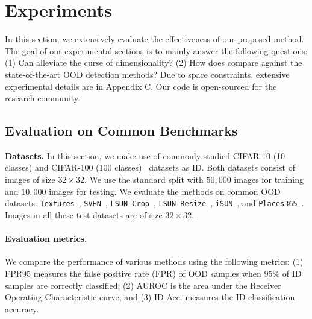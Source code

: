 
\section{Experiments}
\label{sec:experiment}



In this section, we extensively evaluate the effectiveness of our proposed method. 
The goal of our experimental sections is to mainly answer the following questions: (1) Can \name alleviate the curse of dimensionality? (2) How does \name compare against the state-of-the-art OOD detection methods?  Due to space constraints, extensive experimental details are in Appendix C. Our code is open-sourced for the research community.


\subsection{Evaluation on Common Benchmarks}
\label{subsec:common_benchmark}

\noindent \textbf{Datasets.} In this section, we make use of commonly studied CIFAR-10 (10 classes) and CIFAR-100 (100 classes)~\cite{krizhevsky2009learning} datasets as ID. Both datasets consist of images of size $32 \times 32$. We use the standard split with $50,000$ images for training and $10,000$ images for testing. We evaluate the methods on common OOD datasets: \texttt{Textures}~\cite{cimpoi2014describing}, \texttt{SVHN}~\cite{svhn}, \texttt{LSUN-Crop}~\cite{yu2015lsun}, \texttt{LSUN-Resize}~\cite{yu2015lsun}, \texttt{iSUN}~\cite{xu2015turkergaze}, and \texttt{Places365}~\cite{zhou2017places}. Images in all these test datasets are of size $32 \times 32$. 


\paragraph{Evaluation metrics.} We compare the performance of various methods using the following metrics: 
(1) {FPR95} measures the false positive rate (FPR) of OOD samples when $95\%$ of ID samples are correctly classified;
(2) {AUROC} is the area under the Receiver Operating Characteristic curve; 
and (3) {ID Acc.} measures the ID classification accuracy.

